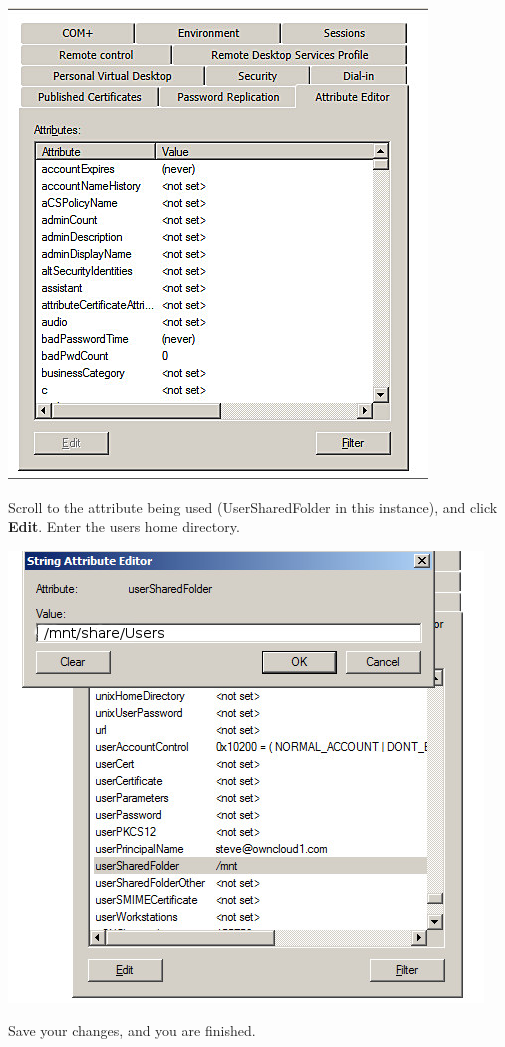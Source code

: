 \documentclass[letterpaper,10pt,english]{sphinxmanual}
\begin{document}
\includegraphics{ldap-home-connector-2.png}

Scroll to the attribute being used (UserSharedFolder in this instance), and
click \textbf{Edit}.  Enter the users home directory.

\includegraphics{ldap-home-connector-3.png}

Save your changes, and you are finished.
\end{document}
